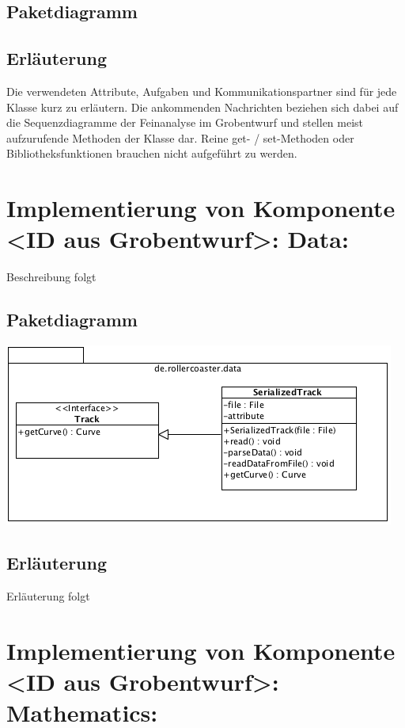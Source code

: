 \subsection{Paketdiagramm}
\subsection{Erläuterung}

Die verwendeten Attribute, Aufgaben und Kommunikationspartner sind für jede
Klasse kurz zu erläutern. Die ankommenden Nachrichten beziehen sich dabei auf
die Sequenzdiagramme der Feinanalyse im Grobentwurf und stellen meist
aufzurufende Methoden der Klasse dar.  Reine get- / set-Methoden oder
Bibliotheksfunktionen brauchen nicht aufgeführt zu werden.

\section{Implementierung von Komponente
         <ID aus Grobentwurf>: Data:}

Beschreibung folgt

\subsection{Paketdiagramm}

\includegraphics[width=\linewidth]{bilder/Data}

\subsection{Erläuterung}

Erläuterung folgt

\section{Implementierung von Komponente
         <ID aus Grobentwurf>: Mathematics:}

